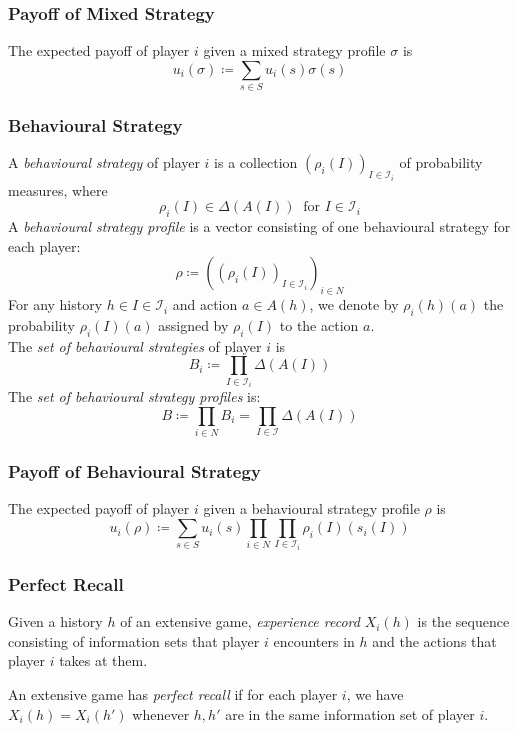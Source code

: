 \documentclass[UTF8,11pt,colorlinks,compress,openany]{beamer}%
\begin{document}
\begin{frame}\frametitle{Payoff of Mixed Strategy}
\begin{definition}
	The expected payoff of player $i$ given a mixed strategy profile $\sigma$ is
	\[u_i(\sigma)\coloneqq \sum\limits_{s\in S}u_i(s)\sigma(s)\]
\end{definition}
\end{frame}

\begin{frame}\frametitle{Behavioural Strategy}
\setlength\abovedisplayskip{0pt}
\begin{definition}
	A \emph{behavioural strategy} of player $i$ is a collection $(\rho_i(I))_{I\in\mathcal{I}_i}$ of probability measures, where \[\rho_i(I)\in\Delta(A(I))\;\;\text{for $I\in\mathcal{I}_i$}\]
	A \emph{behavioural strategy profile} is a vector consisting of one	behavioural strategy for each player:
	\[\rho\coloneqq \left((\rho_i(I))_{I\in\mathcal{I}_i}\right)_{i\in N}\]
	For any history $h\in I\in\mathcal{I}_i$ and action $a\in A(h)$, we denote by $\rho_i(h)(a)$ the probability $\rho_i(I)(a)$ assigned by $\rho_i(I)$ to the action $a$.\\
	The \emph{set of behavioural strategies} of player $i$ is
	\[B_i\coloneqq \prod\limits_{I\in\mathcal{I}_i}\Delta(A(I))\]
	The \emph{set of behavioural strategy profiles} is:
	\[B\coloneqq \prod\limits_{i\in N}B_i=\prod\limits_{I\in\mathcal{I}}\Delta(A(I))\]
\end{definition}
\end{frame}

\begin{frame}\frametitle{Payoff of Behavioural Strategy}
\begin{definition}
	The expected payoff of player $i$ given a behavioural strategy profile $\rho$ is
	\[u_i(\rho)\coloneqq \sum\limits_{s\in S}u_i(s)\prod\limits_{i\in N}\prod\limits_{I\in\mathcal{I}_i}\rho_i(I)(s_i(I))\]
\end{definition}
\end{frame}

\begin{frame}\frametitle{Perfect Recall}
\begin{definition}
Given a history $h$ of an extensive game, \emph{experience record} $X_i(h)$ is the sequence consisting of information sets that player $i$ encounters in $h$ and the actions that player $i$ takes at them.
\end{definition}
\begin{definition}
An extensive game has \emph{perfect recall} if for each player $i$, we have $X_i(h) = X_i(h')$ whenever $h,h'$ are in the same information set of player $i$.
\end{definition}
\end{frame}
\end{document}
